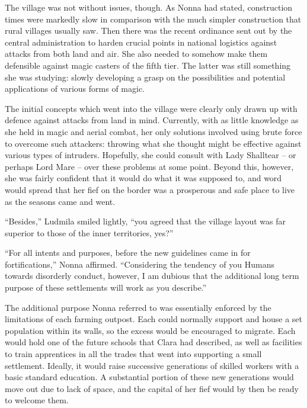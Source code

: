  

The village was not without issues, though. As Nonna had stated, construction times were markedly slow in comparison with the much simpler construction that rural villages usually saw. Then there was the recent ordinance sent out by the central administration to harden crucial points in national logistics against attacks from both land and air. She also needed to somehow make them defensible against magic casters of the fifth tier. The latter was still something she was studying: slowly developing a grasp on the possibilities and potential applications of various forms of magic.

 

The initial concepts which went into the village were clearly only drawn up with defence against attacks from land in mind. Currently, with as little knowledge as she held in magic and aerial combat, her only solutions involved using brute force to overcome such attackers: throwing what she thought might be effective against various types of intruders. Hopefully, she could consult with Lady Shalltear – or perhaps Lord Mare – over these problems at some point. Beyond this, however, she was fairly confident that it would do what it was supposed to, and word would spread that her fief on the border was a prosperous and safe place to live as the seasons came and went.

 

“Besides,” Ludmila smiled lightly, “you agreed that the village layout was far superior to those of the inner territories, yes?”

 

“For all intents and purposes, before the new guidelines came in for fortifications,” Nonna affirmed. “Considering the tendency of you Humans towards disorderly conduct, however, I am dubious that the additional long term purpose of these settlements will work as you describe.”

 

The additional purpose Nonna referred to was essentially enforced by the limitations of each farming outpost. Each could normally support and house a set population within its walls, so the excess would be encouraged to migrate. Each would hold one of the future schools that Clara had described, as well as facilities to train apprentices in all the trades that went into supporting a small settlement. Ideally, it would raise successive generations of skilled workers with a basic standard education. A substantial portion of these new generations would move out due to lack of space, and the capital of her fief would by then be ready to welcome them.

